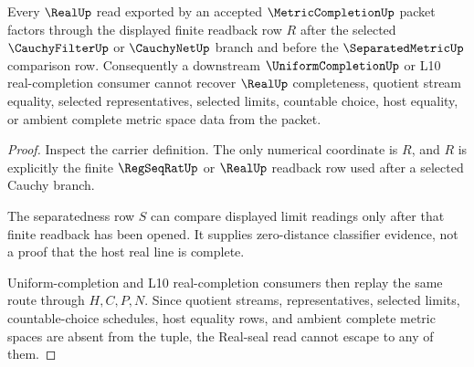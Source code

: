 \begin{theorem}
\label{thm:metriccompletion-real-seal-nonescape}
Every $\RealUp$ read exported by an accepted $\MetricCompletionUp$ packet factors through the displayed finite readback row $R$ after the selected $\CauchyFilterUp$ or $\CauchyNetUp$ branch and before the $\SeparatedMetricUp$ comparison row. Consequently a downstream $\UniformCompletionUp$ or L10 real-completion consumer cannot recover $\RealUp$ completeness, quotient stream equality, selected representatives, selected limits, countable choice, host equality, or ambient complete metric space data from the packet.
\end{theorem}
\begin{proof}
Inspect the carrier definition. The only numerical coordinate is $R$, and $R$ is explicitly the finite $\RegSeqRatUp$ or $\RealUp$ readback row used after a selected Cauchy branch.

The separatedness row $S$ can compare displayed limit readings only after that finite readback has been opened. It supplies zero-distance classifier evidence, not a proof that the host real line is complete.

Uniform-completion and L10 real-completion consumers then replay the same route through $H,C,P,N$. Since quotient streams, representatives, selected limits, countable-choice schedules, host equality rows, and ambient complete metric spaces are absent from the tuple, the Real-seal read cannot escape to any of them.
\end{proof}

